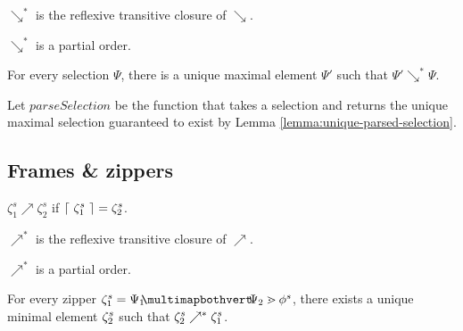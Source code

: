 
\begin{definition}
  $\searrow^*$ is the reflexive transitive
  closure of $\searrow$.
\end{definition}

\begin{lemma}
  $\searrow^*$ is a partial order.
\end{lemma}

\begin{lemma}\label{lemma:unique-parsed-selection}
  For every selection $\Psi$, there is a unique maximal
  element $\Psi'$ such that $\Psi'\searrow^*\Psi$.
\end{lemma}

\begin{definition}
  Let $parseSelection$ be the function that takes a selection
  and returns the unique maximal selection guaranteed to exist
  by Lemma \ref{lemma:unique-parsed-selection}.
\end{definition}


\subsection{Frames \& zippers}





\begin{definition}
  $\zeta^s_1\nearrow\zeta^s_2$ if $\left\lceil~\zeta^s_1~\right\rceil = \zeta^s_2$.
\end{definition}

\begin{definition}
  $\nearrow^*$ is the reflexive transitive closure of $\nearrow$.
\end{definition}

\begin{lemma}
  $\nearrow^*$ is a partial order.
\end{lemma}

\begin{lemma}
  For every zipper $\zip^s_1 = \zipper{\pointing{\selection_1}{\selection_2}}{\tfrelem^s}$, there exists
  a unique minimal element $\zeta^s_2$ such that $\zeta^s_2 \nearrow^* \zeta^s_1$.
\end{lemma}


